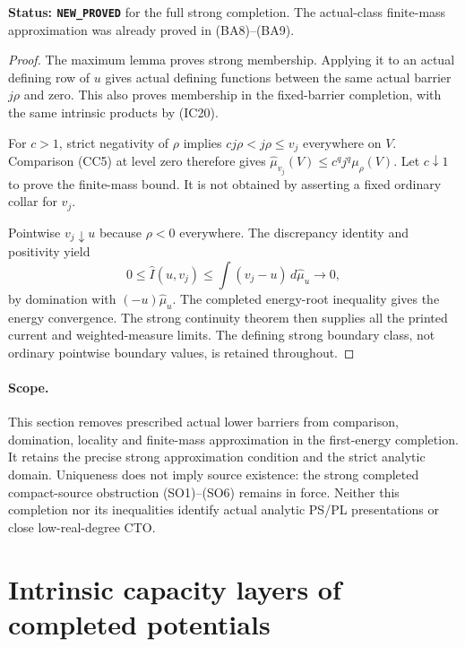 \documentclass[11pt,a4paper]{article}
\numberwithin{equation}{section}
\theoremstyle{definition}
\theoremstyle{remark}
\begin{document}
\noindent\textbf{Status: \texttt{NEW\_PROVED}} for the full
strong completion. The actual-class finite-mass approximation
was already proved in (BA8)--(BA9).

\begin{proof}
The maximum lemma proves strong membership. Applying it to
an actual defining row of $u$ gives actual defining functions
between the same actual barrier $j\rho$ and zero. This also
proves membership in the fixed-barrier completion, with the
same intrinsic products by (IC20).

For $c>1$, strict negativity of $\rho$ implies
$cj\rho<j\rho\leq v_j$ everywhere on $V$.
Comparison (CC5) at level zero therefore gives
$\widehat\mu_{v_j}(V)\leq c^qj^q\mu_\rho(V)$.
Let $c\downarrow1$ to prove the finite-mass bound. It is not
obtained by asserting a fixed ordinary collar for $v_j$.

Pointwise $v_j\downarrow u$ because $\rho<0$ everywhere.
The discrepancy identity and positivity yield
\[
 0\leq\widehat I(u,v_j)
      \leq\int(v_j-u)\,d\widehat\mu_u\longrightarrow0,
\]
by domination with $(-u)\widehat\mu_u$. The completed energy-root
inequality gives the energy convergence. The strong continuity
theorem then supplies all the printed current and weighted-measure
limits. The defining strong boundary class, not ordinary
pointwise boundary values, is retained throughout.
\end{proof}

\paragraph{Scope.}
This section removes prescribed actual lower barriers from
comparison, domination, locality and finite-mass approximation
in the first-energy completion. It retains the precise strong
approximation condition and the strict analytic domain.
Uniqueness does not imply source existence: the strong completed
compact-source obstruction (SO1)--(SO6) remains in force.
Neither this completion nor its inequalities identify actual
analytic PS/PL presentations or close low-real-degree CTO.



\section{Intrinsic capacity layers of completed potentials}
\label{sec:r11-completed-capacity-layers}
\end{document}
